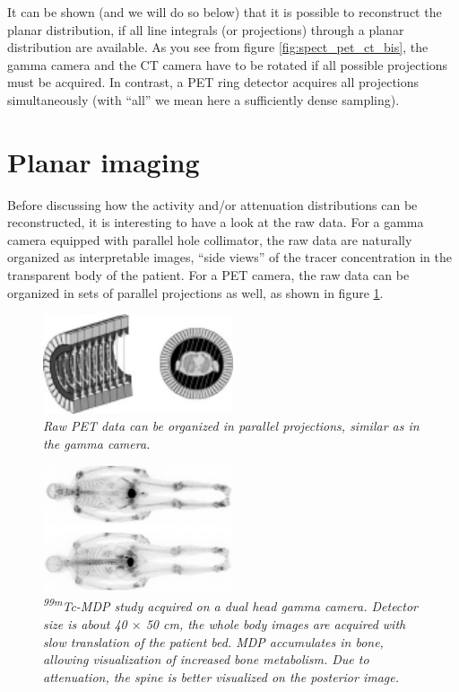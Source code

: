 It can be shown (and we will do so below) that it is possible to reconstruct
the planar distribution, if all line integrals (or projections) through a
planar distribution are available. As you see from figure
\ref{fig:spect_pet_ct_bis}, the gamma camera and the CT camera have to be
rotated if all possible projections must be acquired. In contrast, a PET ring
detector acquires all projections simultaneously (with ``all'' we mean here a
sufficiently dense sampling).

\section{Planar imaging}
Before discussing how the activity and/or attenuation distributions can be
reconstructed, it is interesting to have a look at the raw data. For a gamma
camera equipped with parallel hole collimator, the raw data are naturally
organized as interpretable images, ``side views'' of the tracer concentration
in the transparent body of the patient. For a PET camera, the raw data can be
organized in sets of parallel projections as well, as shown in figure
\ref{fig:pet_parallel}. 

\begin{figure}[tb]
\centering
\includegraphics[width=0.5\textwidth]{figs/fig_pet_parallel.pdf}
\caption{\label{fig:pet_parallel} \emph{Raw PET data can be organized in
parallel projections, similar as in the gamma camera.}}
\end{figure}

\begin{figure}[tb]
\centering
\includegraphics[width=0.5\textwidth]{figs/fig_jnwb.pdf}
\caption{\label{fig:planarwb} \emph{\textsuperscript{99m}Tc-MDP study acquired on a dual
head gamma camera. Detector size is about 40 $\times$ 50 cm, the whole body
images are acquired with slow translation of the patient bed. MDP accumulates
in bone, allowing visualization of increased bone metabolism. Due to
attenuation, the spine is better visualized on the posterior image.}}
\end{figure}

